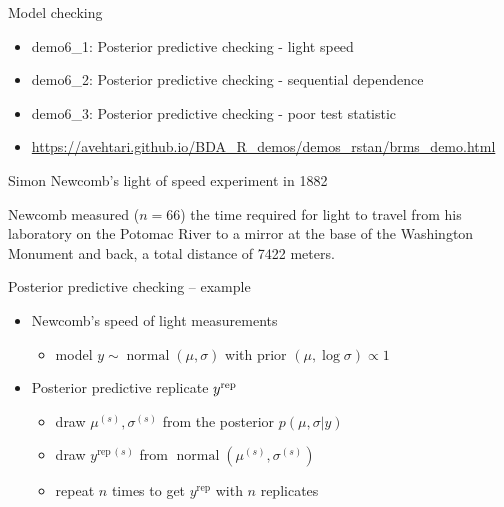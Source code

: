 \documentclass[t]{beamer}
\DeclareMathOperator{\normal}{normal}
\begin{document}
\begin{frame}
  
  {\Large\color{navyblue} Model checking}

  \begin{itemize}
  \item demo6\_1: Posterior predictive checking - light speed
  \item demo6\_2: Posterior predictive checking - sequential dependence
  \item demo6\_3: Posterior predictive checking - poor test statistic
  \item \url{https://avehtari.github.io/BDA_R_demos/demos_rstan/brms_demo.html}
  \end{itemize}

\end{frame}

\begin{frame}
  
  {\large\color{navyblue} Simon Newcomb's light of speed experiment in 1882}

  {
  Newcomb measured ($n=66$) the time required for light to travel from
  his laboratory on the Potomac River to a mirror at the base of the
  Washington Monument and back, a total distance of 7422 meters.}

\end{frame}

\begin{frame}{Posterior predictive checking -- example}

  \begin{itemize}
  \item<1-> Newcomb's speed of light measurements 
    \begin{itemize}
    \item model $y\sim\normal(\mu,\sigma)$ with prior $(\mu,\log\sigma)\propto 1$
    \end{itemize}
  \item<2-> Posterior predictive replicate $y^{\rm rep}$
    \begin{itemize}
    \item<3-> draw $\mu^{(s)},\sigma^{(s)}$ from the posterior $p(\mu,\sigma|y)$
    \item<4-> draw $y^{\mathrm{rep}\,(s)}$ from $\normal(\mu^{(s)},\sigma^{(s)})$
    \item<5-> repeat $n$ times to get $y^{\mathrm{rep}}$ with $n$ replicates\\~\\
      \end{itemize}
    \end{itemize}

\end{frame}
\end{document}
